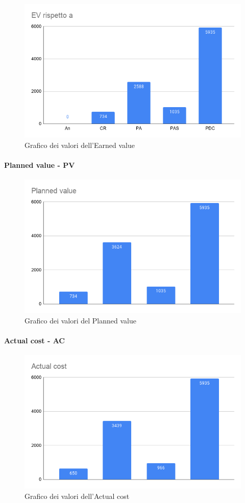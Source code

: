         \begin{figure}[H]
            \centering
            \includegraphics[width=10 cm]{source/sections/images/Earned_value.png}
            \caption{Grafico dei valori dell'Earned value}
        \end{figure}

        \paragraph{Planned value - PV}

        \begin{figure}[H]
            \centering
            \includegraphics[width=10 cm]{source/sections/images/planned_value.png}
            \caption{Grafico dei valori del Planned value}
        \end{figure}

        \paragraph{Actual cost - AC}

        \begin{figure}[H]
            \centering
            \includegraphics[width=10 cm]{source/sections/images/actual_cost.png}
            \caption{Grafico dei valori dell'Actual cost}
        \end{figure}

